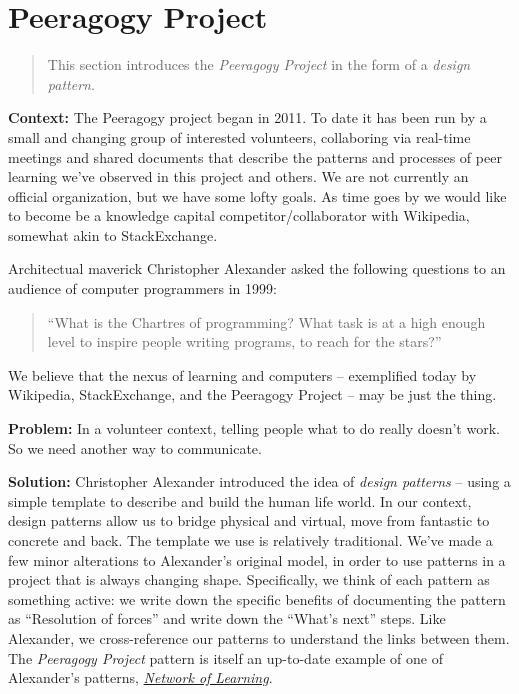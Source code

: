 \section{Peeragogy Project}

\begin{quote}
This section introduces the \emph{Peeragogy Project} in the form of a \emph{design pattern}.
\end{quote}

\textbf{Context:}  The Peeragogy project began in 2011.  To date it has been run by a small and changing group of interested volunteers, collaboring via real-time meetings and shared documents that describe the patterns and processes of peer learning we've observed in this project and others.   We are not currently an official organization, but we have some lofty goals.  As time goes by we would like to become be a knowledge capital competitor/collaborator with Wikipedia, somewhat akin to StackExchange.

Architectual maverick Christopher Alexander asked the following questions to an audience of computer programmers in 1999: 
\begin{quote}
``What is the Chartres of programming? What task is at a high enough level to inspire people writing programs, to reach for the stars?''
\end{quote}
We believe that the nexus of learning and computers -- exemplified today by Wikipedia, StackExchange, and the Peeragogy Project -- may be just the thing.

\textbf{Problem:} In a volunteer context, telling people what to do really doesn't work.  So we need another way to communicate.

\textbf{Solution:} Christopher Alexander introduced the idea of \emph{design patterns} -- using a simple template to describe and build the human life world.  In our context, design patterns allow us to bridge physical and virtual, move from fantastic to concrete and back.  The template we use is relatively traditional.  We've made a few minor alterations to Alexander's original model, in order to use patterns in a project that is always changing shape.  Specifically, we think of each pattern as something active: we write down the specific benefits of documenting the pattern as ``Resolution of forces'' and write down the ``What's next'' steps.  Like Alexander, we cross-reference our patterns to understand the links between them.  The \emph{Peeragogy Project} pattern is itself an up-to-date example of one of Alexander's patterns, \href{http://en.wikipedia.org/wiki/Networked_learning#1970s}{\emph{Network of Learning}}.

